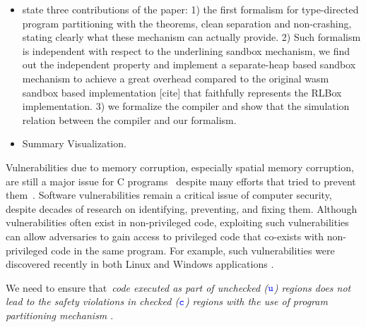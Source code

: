 \begin{itemize}
\item state three contributions of the paper: 1) the first formalism for type-directed program partitioning with the theorems, clean separation and non-crashing, stating clearly what these mechanism can actually provide. 2) Such formalism is independent with respect to the underlining sandbox mechanism, we find out the independent property and implement a separate-heap based sandbox mechanism to achieve a great overhead compared to the original wasm sandbox based implementation [cite] that faithfully represents the RLBox implementation. 3) we formalize the compiler and show that the simulation relation between the compiler and our formalism.

\item Summary Visualization.

\end{itemize}


Vulnerabilities due to memory corruption, especially spatial memory corruption, 
are still a major issue for C programs~\cite{cvetrend, microsoftmemsafe, Zeng:2013:SRF:2534766.2534798} 
despite many efforts that tried to prevent them~\cite{song2019sanitizing}.
Software vulnerabilities remain a critical issue of computer security,
despite decades of research on identifying, preventing, and fixing
them. Although vulnerabilities often exist in non-privileged code,
exploiting such vulnerabilities can allow adversaries to gain access
to privileged code that co-exists with non-privileged code in the
same program. For example, such vulnerabilities were discovered
recently in both Linux and Windows applications .

%
We need to ensure that~\emph{code executed as part of 
unchecked ($\textcolor{blue}{\texttt{u}}$) regions does not lead to the safety violations in checked ($\textcolor{blue}{\texttt{c}}$) regions  with the use of program partitioning mechanism \cite{rul2009towards}}.

